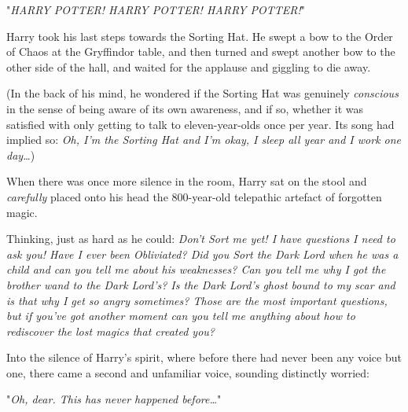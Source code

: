 "\emph{HARRY POTTER! HARRY POTTER! HARRY POTTER!}"

Harry took his last steps towards the Sorting Hat. He swept a bow to the Order
of Chaos at the Gryffindor table, and then turned and swept another bow to the
other side of the hall, and waited for the applause and giggling to die away.

(In the back of his mind, he wondered if the Sorting Hat was genuinely
\emph{conscious} in the sense of being aware of its own awareness, and if so,
whether it was satisfied with only getting to talk to eleven-year-olds once per
year. Its song had implied so: \emph{Oh, I'm the Sorting Hat and I'm okay, I
sleep all year and I work one day…})

When there was once more silence in the room, Harry sat on the stool and
\emph{carefully} placed onto his head the 800-year-old telepathic artefact of
forgotten magic.

Thinking, just as hard as he could: \emph{Don't Sort me yet! I have questions I
need to ask you! Have I ever been Obliviated? Did you Sort the Dark Lord when
he was a child and can you tell me about his weaknesses? Can you tell me why I
got the brother wand to the Dark Lord's? Is the Dark Lord's ghost bound to my
scar and is that why I get so angry sometimes? Those are the most important
questions, but if you've got another moment can you tell me anything about how
to rediscover the lost magics that created you?}

Into the silence of Harry's spirit, where before there had never been any voice
but one, there came a second and unfamiliar voice, sounding distinctly worried:

"\emph{Oh, dear. This has never happened before…}"
